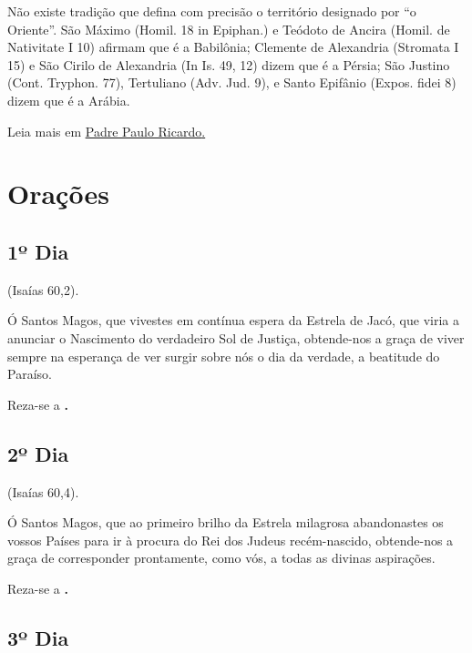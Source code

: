 \documentclass[a4paper,14pt]{extarticle} \usepackage[utf8]{inputenc}
\begin{document}
Não existe tradição que defina com precisão o território designado por “o Oriente”. São Máximo (Homil. 18 in Epiphan.) e Teódoto de Ancira (Homil. de Nativitate I 10) afirmam que é a Babilônia; Clemente de Alexandria (Stromata I 15) e São Cirilo de Alexandria (In Is. 49, 12) dizem que é a Pérsia; São Justino (Cont. Tryphon. 77), Tertuliano (Adv. Jud. 9), e Santo Epifânio (Expos. fidei 8) dizem que é a Arábia.


\vfill

Leia mais em {\color{blue} \underline{\href{https://padrepauloricardo.org/blog/quem-foram-os-tres-reis-magos-e-quando-visitaram-jesus}{Padre Paulo Ricardo}.}}

\newpage

\section{Orações}

\subsection{1º Dia}

 (Isaías 60,2). 

Ó Santos Magos, que vivestes em contínua espera da Estrela de Jacó, que viria a anunciar o Nascimento do verdadeiro Sol de Justiça, obtende-nos a graça de viver sempre na esperança de ver surgir sobre nós o dia da verdade, a beatitude do Paraíso. 

Reza-se a \textbf{.}


\subsection{2º Dia}

 (Isaías 60,4).  

Ó Santos Magos, que ao primeiro brilho da Estrela milagrosa abandonastes os vossos Países para ir à procura do Rei dos Judeus recém-nascido, obtende-nos a graça de corresponder prontamente, como vós, a todas as divinas aspirações. 

Reza-se a \textbf{.}


\subsection{3º Dia}
\end{document}
